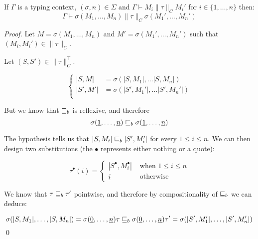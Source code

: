 \begin{lemma}
    If $\Gamma$ is a typing context, $(\sigma,n) \in \Sigma$
    and $\Gamma \vdash M_i \| \tau \|_C M_i'$ for $i \in \{ 1, \dots, n\}$
    then:
    \begin{equation*}
        \Gamma \vdash \sigma(M_1, \dots, M_n) \| \tau \|_C \sigma(M_1', \dots,
        M_n')
    \end{equation*}
\end{lemma}
\begin{proof}
        Let $M = \sigma (M_1, \dots, M_n)$ 
        and $M' = \sigma (M_1', \dots, M_n')$
        such that $(M_i,M_i') \in \| \tau \|_C$.

        Let $(S,S') \in \| \tau \|_C^\top$.

        \begin{equation*}
            \begin{cases}
                |S,M|   &= \sigma (|S,M_1|, \dots |S,M_n|) \\
                |S',M'| &= \sigma (|S',M_1'|, \dots |S',M_n'|) \\
            \end{cases}
        \end{equation*}

        But we know that $\sqsubseteq_b$ is reflexive, and 
        therefore
        \begin{equation*}
            \sigma(\underline{1}, \dots, \underline{n})
            \sqsubseteq_b \sigma(\underline{1}, \dots, \underline{n})
        \end{equation*}

        The hypothesis tells us that $|S,M_i| \sqsubseteq_b |S',M_i'|$
        for every $1 \leq i \leq n$. We can then design
        two substitutions (the $\bullet$ represents either 
        nothing or a quote):

        \begin{equation*}
            \tau^\bullet (i) = \begin{cases}
                |S^\bullet, M_i^\bullet| & \text{ when } 1 \leq i \leq n \\
                \underline{i}            & \text{ otherwise } 
            \end{cases}
        \end{equation*}

        We know that $\tau \sqsubseteq_b \tau'$ pointwise, and therefore
        by compositionality of $\sqsubseteq_b$ we can deduce:

        \begin{equation*}
            \sigma (|S,M_1|, \dots, |S,M_n|)
            = \sigma(\underline{0}, \dots, \underline{n}) \tau
            \sqsubseteq_b
             \sigma(\underline{0}, \dots, \underline{n}) \tau'
            =
            \sigma (|S',M_1'|, \dots, |S',M_n'|)
        \end{equation*}
\qed\end{proof}

